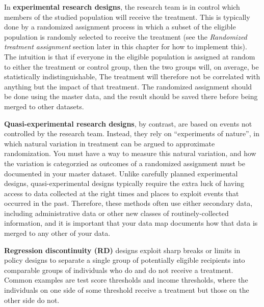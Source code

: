 In \textbf{experimental research designs},
 
the research team is in control which members
of the studied population will receive the treatment.
This is typically done by a randomized assignment process
in which a subset of the eligible population
is randomly selected to receive the treatment
(see the \textit{Randomized treatment assignment} section
later in this chapter for how to implement this).
The intuition is that if everyone in the eligible population
is assigned at random to either the treatment or control group,
then the two groups will, on average, be statistically indistinguishable,
The treatment will therefore not be correlated with anything
but the impact of that treatment.\cite{duflo2007using}
The randomized assignment should be done using the master data,
and the result should be saved there before being merged to other datasets.


\textbf{Quasi-experimental research designs},
by contrast, are based on events not controlled by the research team.
Instead, they rely on ``experiments of nature'',
in which natural variation in treatment can be argued to approximate randomization.
You must have a way to measure this natural variation,
and how the variation is categorzied as outcomes of a randomized assignment
must be documented in your master dataset.
Unlike carefully planned experimental designs,
quasi-experimental designs typically require the extra luck
of having access to data collected at the right times and places
to exploit events that occurred in the past.
Therefore, these methods often use either secondary data,
including administrative data or other new classes of routinely-collected information,
and it is important that your data map documents 
how that data is merged to any other of your data.



\textbf{Regression discontinuity (RD)}
designs exploit sharp breaks or limits
in policy designs to separate a single group of potentially eligible recipients
into comparable groups of individuals who do and do not receive a treatment.
Common examples are test score thresholds and income thresholds,
where the individuals on one side of some threshold receive
a treatment but those on the other side do not.

